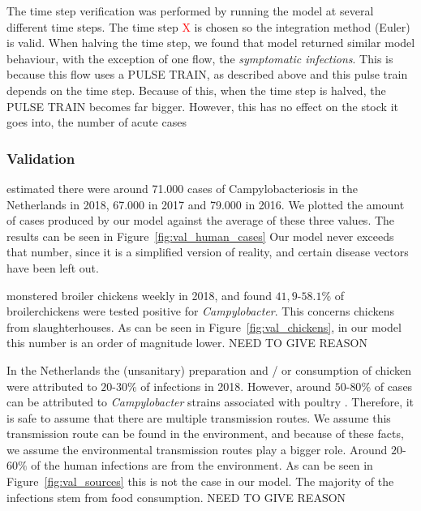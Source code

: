 The time step verification was performed by running the model at several different time steps. The time step \textcolor{red}{X} is chosen so the integration method (Euler) is valid. When halving the time step, we found that model returned similar model behaviour, with the exception of one flow, the \textit{symptomatic infections}. This is because this flow uses a PULSE TRAIN, as described above and this pulse train depends on the time step. Because of this, when the time step is halved, the PULSE TRAIN becomes far bigger. However, this has no effect on the stock it goes into, the number of acute cases 


    
\subsubsection{Validation}    

    
\textcite{vlaanderen_staat_2019} estimated there were around 71.000 cases of Campylobacteriosis in the Netherlands in 2018, 67.000 in 2017 and 79.000 in 2016. We plotted the amount of cases produced by our model against the average of these three values. The results can be seen in Figure~\ref{fig:val_human_cases} Our model never exceeds that number, since it is a simplified version of reality, and certain disease vectors have been left out.

\textcite{nepluvi_rapportage_2019} monstered broiler chickens weekly in 2018, and found $41,9$-$58.1\%$ of broilerchickens were tested positive for \textit{Campylobacter}. This concerns chickens from slaughterhouses. As can be seen in Figure~\ref{fig:val_chickens}, in our model this number is an order of magnitude lower. NEED TO GIVE REASON

In the Netherlands the (unsanitary) preparation and / or consumption of chicken were attributed to $20$-$30\%$ of infections in 2018. However, around $50$-$80\%$ of cases can be attributed to \textit{Campylobacter} strains associated with poultry \parencite{cuperus_surveillance_2020, nepluvi_rapportage_2019}. Therefore, it is safe to assume that there are multiple transmission routes. We assume this transmission route can be found in the environment, and because of these facts, we assume the environmental transmission routes play a bigger role. Around $20$-$60\%$ of the human infections are from the environment. As can be seen in Figure~\ref{fig:val_sources} this is not the case in our model. The majority of the infections stem from food consumption. NEED TO GIVE REASON

